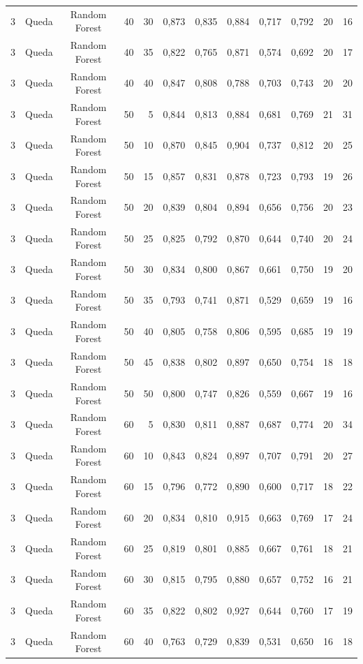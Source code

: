 \begin{longtable}{ccclrrrrrrrr}
3 & Queda & Random Forest & 40 & 30 & 0,873 & 0,835 & 0,884 & 0,717 & 0,792 & 20 & 16 \\
3 & Queda & Random Forest & 40 & 35 & 0,822 & 0,765 & 0,871 & 0,574 & 0,692 & 20 & 17 \\
3 & Queda & Random Forest & 40 & 40 & 0,847 & 0,808 & 0,788 & 0,703 & 0,743 & 20 & 20 \\
3 & Queda & Random Forest & 50 & 5 & 0,844 & 0,813 & 0,884 & 0,681 & 0,769 & 21 & 31 \\
3 & Queda & Random Forest & 50 & 10 & 0,870 & 0,845 & 0,904 & 0,737 & 0,812 & 20 & 25 \\
3 & Queda & Random Forest & 50 & 15 & 0,857 & 0,831 & 0,878 & 0,723 & 0,793 & 19 & 26 \\
3 & Queda & Random Forest & 50 & 20 & 0,839 & 0,804 & 0,894 & 0,656 & 0,756 & 20 & 23 \\
3 & Queda & Random Forest & 50 & 25 & 0,825 & 0,792 & 0,870 & 0,644 & 0,740 & 20 & 24 \\
3 & Queda & Random Forest & 50 & 30 & 0,834 & 0,800 & 0,867 & 0,661 & 0,750 & 19 & 20 \\
3 & Queda & Random Forest & 50 & 35 & 0,793 & 0,741 & 0,871 & 0,529 & 0,659 & 19 & 16 \\
3 & Queda & Random Forest & 50 & 40 & 0,805 & 0,758 & 0,806 & 0,595 & 0,685 & 19 & 19 \\
3 & Queda & Random Forest & 50 & 45 & 0,838 & 0,802 & 0,897 & 0,650 & 0,754 & 18 & 18 \\
3 & Queda & Random Forest & 50 & 50 & 0,800 & 0,747 & 0,826 & 0,559 & 0,667 & 19 & 16 \\
3 & Queda & Random Forest & 60 & 5 & 0,830 & 0,811 & 0,887 & 0,687 & 0,774 & 20 & 34 \\
3 & Queda & Random Forest & 60 & 10 & 0,843 & 0,824 & 0,897 & 0,707 & 0,791 & 20 & 27 \\
3 & Queda & Random Forest & 60 & 15 & 0,796 & 0,772 & 0,890 & 0,600 & 0,717 & 18 & 22 \\
3 & Queda & Random Forest & 60 & 20 & 0,834 & 0,810 & 0,915 & 0,663 & 0,769 & 17 & 24 \\
3 & Queda & Random Forest & 60 & 25 & 0,819 & 0,801 & 0,885 & 0,667 & 0,761 & 18 & 21 \\
3 & Queda & Random Forest & 60 & 30 & 0,815 & 0,795 & 0,880 & 0,657 & 0,752 & 16 & 21 \\
3 & Queda & Random Forest & 60 & 35 & 0,822 & 0,802 & 0,927 & 0,644 & 0,760 & 17 & 19 \\
3 & Queda & Random Forest & 60 & 40 & 0,763 & 0,729 & 0,839 & 0,531 & 0,650 & 16 & 18 \\

\end{longtable}
